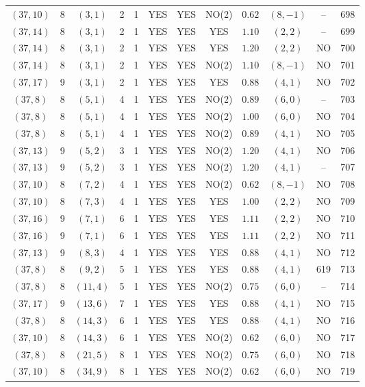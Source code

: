 \begin{longtable}{|c|c|c|c|c|c|c|c|c|c|c|c|}
$(37,10)$ & 8 & $(3,1)$ & 2 & 1 & YES & YES & NO(2) & $0.62$ & $(8,-1)$ & -- & 698\\
$(37,14)$ & 8 & $(3,1)$ & 2 & 1 & YES & YES & YES & $1.10$ & $(2,2)$ & -- & 699\\
$(37,14)$ & 8 & $(3,1)$ & 2 & 1 & YES & YES & YES & $1.20$ & $(2,2)$ & NO & 700\\
$(37,14)$ & 8 & $(3,1)$ & 2 & 1 & YES & YES & NO(2) & $1.10$ & $(8,-1)$ & NO & 701\\
$(37,17)$ & 9 & $(3,1)$ & 2 & 1 & YES & YES & YES & $0.88$ & $(4,1)$ & NO & 702\\
$(37,8)$ & 8 & $(5,1)$ & 4 & 1 & YES & YES & NO(2) & $0.89$ & $(6,0)$ & -- & 703\\
$(37,8)$ & 8 & $(5,1)$ & 4 & 1 & YES & YES & NO(2) & $1.00$ & $(6,0)$ & NO & 704\\
$(37,8)$ & 8 & $(5,1)$ & 4 & 1 & YES & YES & NO(2) & $0.89$ & $(4,1)$ & NO & 705\\
$(37,13)$ & 9 & $(5,2)$ & 3 & 1 & YES & YES & NO(2) & $1.20$ & $(4,1)$ & NO & 706\\
$(37,13)$ & 9 & $(5,2)$ & 3 & 1 & YES & YES & NO(2) & $1.20$ & $(4,1)$ & -- & 707\\
$(37,10)$ & 8 & $(7,2)$ & 4 & 1 & YES & YES & NO(2) & $0.62$ & $(8,-1)$ & NO & 708\\
$(37,10)$ & 8 & $(7,3)$ & 4 & 1 & YES & YES & YES & $1.00$ & $(2,2)$ & NO & 709\\
$(37,16)$ & 9 & $(7,1)$ & 6 & 1 & YES & YES & YES & $1.11$ & $(2,2)$ & NO & 710\\
$(37,16)$ & 9 & $(7,1)$ & 6 & 1 & YES & YES & YES & $1.11$ & $(2,2)$ & NO & 711\\
$(37,13)$ & 9 & $(8,3)$ & 4 & 1 & YES & YES & YES & $0.88$ & $(4,1)$ & NO & 712\\
$(37,8)$ & 8 & $(9,2)$ & 5 & 1 & YES & YES & YES & $0.88$ & $(4,1)$ & 619 & 713\\
$(37,8)$ & 8 & $(11,4)$ & 5 & 1 & YES & YES & NO(2) & $0.75$ & $(6,0)$ & -- & 714\\
$(37,17)$ & 9 & $(13,6)$ & 7 & 1 & YES & YES & YES & $0.88$ & $(4,1)$ & NO & 715\\
$(37,8)$ & 8 & $(14,3)$ & 6 & 1 & YES & YES & YES & $0.88$ & $(4,1)$ & NO & 716\\
$(37,10)$ & 8 & $(14,3)$ & 6 & 1 & YES & YES & NO(2) & $0.62$ & $(6,0)$ & NO & 717\\
$(37,8)$ & 8 & $(21,5)$ & 8 & 1 & YES & YES & NO(2) & $0.75$ & $(6,0)$ & NO & 718\\
$(37,10)$ & 8 & $(34,9)$ & 8 & 1 & YES & YES & NO(2) & $0.62$ & $(6,0)$ & NO & 719\\

\end{longtable}

